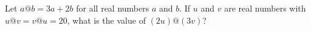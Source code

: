 Let $a@b=3a+2b$ for all real numbers $a$ and $b$. If $u$ and $v$ are real numbers with $u@v=v@u=20$, what is the value of $(2u)@(3v)$?
